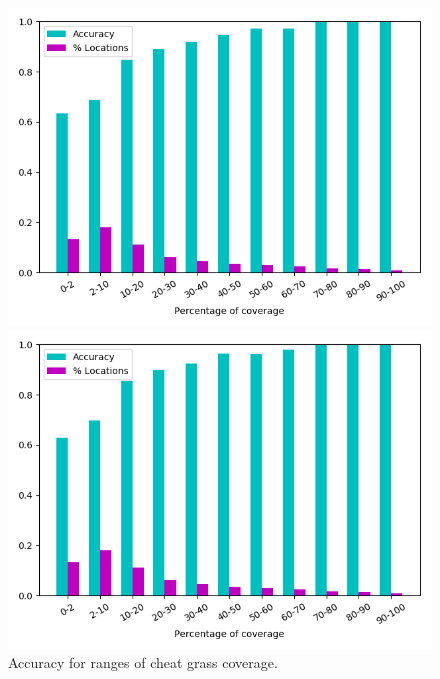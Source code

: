 \documentclass{article} %
\begin{document}
\begin{figure}
\begin{minipage}{.24\textwidth}
\caption{$D_2$}
\end{minipage}
\begin{minipage}{.24\textwidth}
  \centering
\includegraphics[width=\textwidth]{pics/d3_accuracy_vs_coverage.png}
\caption{$D_3$}
\end{minipage}
\begin{minipage}{.01\textwidth}
\end{minipage}
\begin{minipage}{.24\textwidth}
  \centering
\includegraphics[width=\textwidth]{pics/d4_accuracy_vs_coverage.png}
\caption{$D_4$}
\end{minipage}
\caption{Accuracy for ranges of cheat grass coverage.}\label{fig:testmetrics}
\end{figure}
\end{document}
